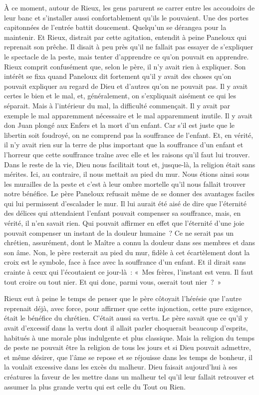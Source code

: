 \documentclass[french,twoside]{book} %
\begin{document}
À ce moment, autour de Rieux, les gens parurent se carrer entre les accoudoirs de leur banc et s’installer aussi confortablement qu’ils le pouvaient. Une des portes capitonnées de l’entrée battit doucement. Quelqu’un se dérangea pour la maintenir. Et Rieux, distrait par cette agitation, entendit à peine Paneloux qui reprenait son prêche. Il disait à peu près qu’il ne fallait pas essayer de s’expliquer le spectacle de la peste, mais tenter d’apprendre ce qu’on pouvait en apprendre. Rieux comprit confusément que, selon le père, il n’y avait rien à expliquer. Son intérêt se fixa quand Paneloux dit fortement qu’il y avait des choses qu’on pouvait expliquer au regard de Dieu et d’autres qu’on ne pouvait pas. Il y avait certes le bien et le mal, et, généralement, on s’expliquait aisément ce qui les séparait. Mais à l’intérieur du mal, la difficulté commençait. Il y avait par exemple le mal apparemment nécessaire et le mal apparemment inutile. Il y avait don Juan plongé aux Enfers et la mort d’un enfant. Car s’il est juste que le libertin soit foudroyé, on ne comprend pas la souffrance de l’enfant. Et, en vérité, il n’y avait rien sur la terre de plus important que la souffrance d’un enfant et l’horreur que cette souffrance traîne avec elle et les raisons qu’il faut lui trouver. Dans le reste de la vie, Dieu nous facilitait tout et, jusque-là, la religion était sans mérites. Ici, au contraire, il nous mettait au pied du mur. Nous étions ainsi sous les murailles de la peste et c’est à leur ombre mortelle qu’il nous fallait trouver notre bénéfice. Le père Paneloux refusait même de se donner des avantages faciles qui lui permissent d’escalader le mur. Il lui aurait été aisé de dire que l’éternité des délices qui attendaient l’enfant pouvait compenser sa souffrance, mais, en vérité, il n’en savait rien. Qui pouvait affirmer en effet que l’éternité d’une joie pouvait compenser un instant de la douleur humaine ? Ce ne serait pas un chrétien, assurément, dont le Maître a connu la douleur dans ses membres et dans son âme. Non, le père resterait au pied du mur, fidèle à cet écartèlement dont la croix est le symbole, face à face avec la souffrance d’un enfant. Et il dirait sans crainte à ceux qui l’écoutaient ce jour-là : « Mes frères, l’instant est venu. Il faut tout croire ou tout nier. Et qui donc, parmi vous, oserait tout nier ? »\par
Rieux eut à peine le temps de penser que le père côtoyait l’hérésie que l’autre reprenait déjà, avec force, pour affirmer que cette injonction, cette pure exigence, était le bénéfice du chrétien. C’était aussi sa vertu. Le père savait que ce qu’il y avait d’excessif dans la vertu dont il allait parler choquerait beaucoup d’esprits, habitués à une morale plus indulgente et plus classique. Mais la religion du temps de peste ne pouvait être la religion de tous les jours et si Dieu pouvait admettre, et même désirer, que l’âme se repose et se réjouisse dans les temps de bonheur, il la voulait excessive dans les excès du malheur. Dieu faisait aujourd’hui à ses créatures la faveur de les mettre dans un malheur tel qu’il leur fallait retrouver et assumer la plus grande vertu qui est celle du Tout ou Rien.\par
\end{document}
